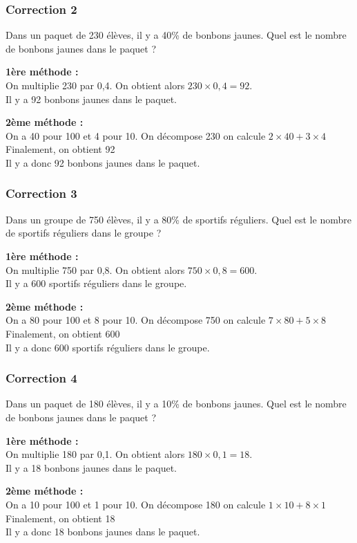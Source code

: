 \documentclass[15pt, mathserif]{beamer}
\begin{document}
\begin{frame}
\vspace{-10mm}
	\frametitle{Correction 2}
Dans un paquet de 230 élèves, il y a 40\% de bonbons jaunes. Quel est le nombre de bonbons jaunes dans le paquet ? \begin{multicols}{2} \textbf{1ère méthode : \\} On multiplie 230 par 0,4. On obtient alors $230 \times 0,4=92$. \\ Il y a 92 bonbons jaunes dans le paquet. 
 \columnbreak 
 
 \textbf{2ème méthode :} \\ On a 40 pour 100 et 4 pour 10. On décompose 230 on calcule $2\times40+3\times4$ \\ Finalement, on obtient 92\\ Il y a donc 92 bonbons jaunes dans le paquet. \end{multicols}\end{frame}


\begin{frame}
\vspace{-10mm}
	\frametitle{Correction 3}
Dans un groupe de 750 élèves, il y a 80\% de sportifs réguliers. Quel est le nombre de sportifs réguliers dans le groupe ? \begin{multicols}{2} \textbf{1ère méthode : \\} On multiplie 750 par 0,8. On obtient alors $750 \times 0,8=600$. \\ Il y a 600 sportifs réguliers dans le groupe. 
 \columnbreak 
 
 \textbf{2ème méthode :} \\ On a 80 pour 100 et 8 pour 10. On décompose 750 on calcule $7\times80+5\times8$ \\ Finalement, on obtient 600\\ Il y a donc 600 sportifs réguliers dans le groupe. \end{multicols}\end{frame}


\begin{frame}
\vspace{-10mm}
	\frametitle{Correction 4}
Dans un paquet de 180 élèves, il y a 10\% de bonbons jaunes. Quel est le nombre de bonbons jaunes dans le paquet ? \begin{multicols}{2} \textbf{1ère méthode : \\} On multiplie 180 par 0,1. On obtient alors $180 \times 0,1=18$. \\ Il y a 18 bonbons jaunes dans le paquet. 
 \columnbreak 
 
 \textbf{2ème méthode :} \\ On a 10 pour 100 et 1 pour 10. On décompose 180 on calcule $1\times10+8\times1$ \\ Finalement, on obtient 18\\ Il y a donc 18 bonbons jaunes dans le paquet. \end{multicols}\end{frame}
\end{document}
